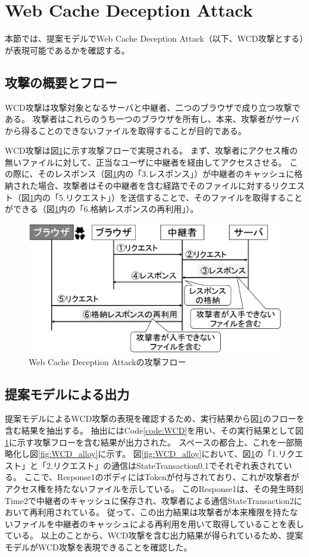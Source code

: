 \documentclass[12pt,a4paper]{jbook}
\begin{document}
\section{Web Cache Deception Attack}
本節では、提案モデルでWeb Cache Deception Attack\cite{WCD}（以下、WCD攻撃とする）が表現可能であるかを確認する。

\subsection{攻撃の概要とフロー}
WCD攻撃は攻撃対象となるサーバと中継者、二つのブラウザで成り立つ攻撃である。
攻撃者はこれらのうち一つのブラウザを所有し、本来、攻撃者がサーバから得ることのできないファイルを取得することが目的である。

WCD攻撃は図\ref{fig:WCD_flow}に示す攻撃フローで実現される。
まず、攻撃者にアクセス権の無いファイルに対して、正当なユーザに中継者を経由してアクセスさせる。
この際に、そのレスポンス（図\ref{fig:WCD_flow}内の「3.レスポンス」）が中継者のキャッシュに格納された場合、攻撃者はその中継者を含む経路でそのファイルに対するリクエスト（図\ref{fig:WCD_flow}内の「5.リクエスト」）を送信することで、そのファイルを取得することができる（図\ref{fig:WCD_flow}内の「6.格納レスポンスの再利用」）。

\begin{figure}[htb]
\centering
\includegraphics[width=450pt]{./fig/WCD_flow.eps}
\caption{Web Cache Deception Attackの攻撃フロー}
\label{fig:WCD_flow}
\end{figure}

\subsection{提案モデルによる出力}
提案モデルによるWCD攻撃の表現を確認するため、実行結果から図\ref{fig:WCD_flow}のフローを含む結果を抽出する。
抽出にはCode\ref{code:WCD}を用い、その実行結果として図\ref{fig:WCD_flow}に示す攻撃フローを含む結果が出力された。
スペースの都合上、これを一部簡略化し図\ref{fig:WCD_alloy}に示す。
図\ref{fig:WCD_alloy}において、図\ref{fig:WCD_flow}の「1.リクエスト」と「2.リクエスト」の通信はStateTransaction0,1でそれぞれ表されている。
ここで、Response1のボディにはTokenが付与されており、これが攻撃者がアクセス権を持たないファイルを示している。
このResponse1は、その発生時刻Time2で中継者のキャッシュに保存され、攻撃者による通信StateTransaction2において再利用されている。
従って、この出力結果は攻撃者が本来権限を持たないファイルを中継者のキャッシュによる再利用を用いて取得していることを表している。
以上のことから、WCD攻撃を含む出力結果が得られているため、提案モデルがWCD攻撃を表現できることを確認した。
\end{document}
